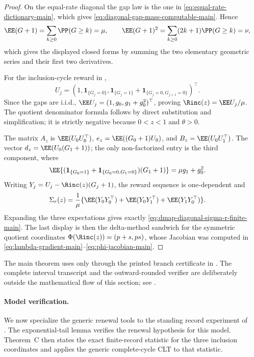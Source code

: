 \begin{proof}
On the equal-rate diagonal the gap law is the one in
\eqref{eq:equal-rate-dictionary-main}, which gives
\eqref{eq:diagonal-gap-mass-computable-main}.  Hence
\[
\EE(G+1)=\sum_{k\ge0}\PP(G\ge k)=\mu,\qquad
\EE(G+1)^2=\sum_{k\ge0}(2k+1)\PP(G\ge k)=\nu ,
\]
which gives the displayed closed forms by summing the two elementary geometric
series and their first two derivatives.

For the inclusion-cycle reward in
,
\[
U_j=\left(1,\mathbf1_{\{G_j=0\}},
\mathbf1_{\{G_j=1\}}+\mathbf1_{\{G_j=0,G_{j+1}=0\}}\right)^\top .
\]
Since the gaps are i.i.d., \(\EE U_j=(1,g_0,g_1+g_0^2)^\top\), proving
\(\Rinc(z)=\EE U_j/\mu\).  The quotient denominator formula follows by direct
substitution and simplification; it is strictly negative because
\(0<z<1\) and \(\theta>0\).

The matrix \(A_z\) is \(\EE(U_0U_0^\top)\), \(e_z=\EE((G_0+1)U_0)\), and
\(B_z=\EE(U_0U_1^\top)\).  The vector \(d_z=\EE(U_0(G_1+1))\); the only
non-factorized entry is the third component, where
\[
\EE\{(\mathbf1_{\{G_0=1\}}+\mathbf1_{\{G_0=0,G_1=0\}})(G_1+1)\}
=\mu g_1+g_0^2 .
\]
Writing \(Y_j=U_j-\Rinc(z)(G_j+1)\), the reward sequence is one-dependent and
\[
\Sigma_r(z)
=\frac1\mu\{\EE(Y_0Y_0^\top)+\EE(Y_0Y_1^\top)+\EE(Y_1Y_0^\top)\}.
\]
Expanding the three expectations gives exactly
\eqref{eq:dmap-diagonal-sigma-r-finite-main}.  The last display is then the
delta-method sandwich for the symmetric quotient coordinates
\(\Phi(\Rinc(z))=(p+s,ps)\), whose Jacobian was computed in
\eqref{eq:lambda-gradient-main}--\eqref{eq:phi-jacobian-main}.
\end{proof}

The main theorem uses
 only through the printed
branch certificate in
.  The complete
interval transcript and the outward-rounded verifier are deliberately outside
the mathematical flow of this section; see
.

\paragraph{Model verification.}
We now specialize the generic renewal tools to the standing record experiment
of .  The exponential-tail lemma
verifies the renewal hypothesis for this model.  Theorem~C then states the
exact finite-record statistic for the three inclusion coordinates and applies
the generic complete-cycle CLT to that statistic.

